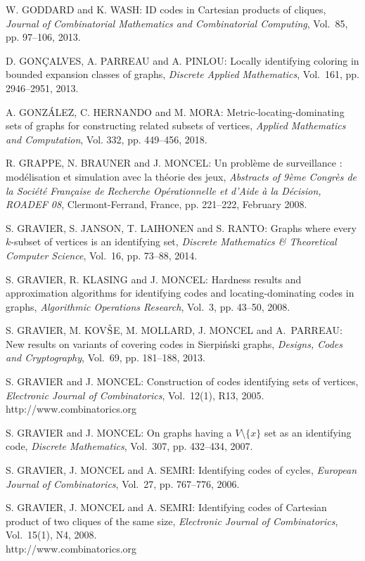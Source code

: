 \begin{thebibliography}{999}
W. GODDARD and K. WASH: ID codes in Cartesian products of cliques, {\it Journal of Combinatorial Mathematics and Combinatorial Computing}, Vol.~85, pp. 97--106, 2013.

D. GON\c CALVES, A. PARREAU and A. PINLOU: Locally identifying coloring in bounded expansion classes of graphs, {\it Discrete Applied Mathematics}, Vol.~161, pp. 2946--2951, 2013.

A. GONZ\'ALEZ, C. HERNANDO and  M. MORA: Metric-locating-dominating sets of graphs for constructing related subsets of vertices, {\it Applied Mathematics and Computation}, Vol. 332, pp. 449--456, 2018.

R. GRAPPE, N. BRAUNER and J. MONCEL: Un probl\`eme de surveillance : mod\'elisation et simulation avec la th\'eorie des jeux, {\it Abstracts of 9\`eme Congr\`es de la Soci\'et\'e Fran\c{c}aise de Recherche Op\'erationnelle et d'Aide \`a la D\'ecision, ROADEF 08}, Clermont-Ferrand, France, pp. 221--222, February 2008.

S. GRAVIER, S. JANSON, T. LAIHONEN and S. RANTO: Graphs where every $k$-subset of vertices is an identifying set, {\it Discrete Mathematics \& Theoretical Computer Science}, Vol.~16, pp. 73--88, 2014.

S. GRAVIER, R. KLASING and J. MONCEL: Hardness results and approximation algorithms for identifying codes and locating-dominating codes in graphs, {\it Algorithmic Operations Research}, Vol.~3, pp. 43--50, 2008.

S. GRAVIER, M. KOV$\check{\rm S}$E, M. MOLLARD, J. MONCEL and A.~PARREAU: New results on variants of covering codes in Sierpi\'nski graphs, {\it Designs, Codes and Cryptography}, Vol.~69, pp. 181--188, 2013.

S. GRAVIER and J. MONCEL: Construction of codes identifying sets of vertices, {\it Electronic Journal of Combinatorics}, Vol.~12(1), R13, 2005.\\
http://www.combinatorics.org

S. GRAVIER and J. MONCEL: On graphs having a $V \setminus \{ x \}$ set as an identifying code, {\it Discrete Mathematics}, Vol.~307, pp. 432--434, 2007.

S. GRAVIER, J. MONCEL and A. SEMRI: Identifying codes of cycles, {\it European Journal of Combinatorics}, Vol.~27, pp. 767--776, 2006.

S. GRAVIER, J. MONCEL and A. SEMRI: Identifying codes of Cartesian product of two cliques of the same size, {\it Electronic Journal of Combinatorics}, Vol.~15(1), N4, 2008.\\
http://www.combinatorics.org


\end{thebibliography}
